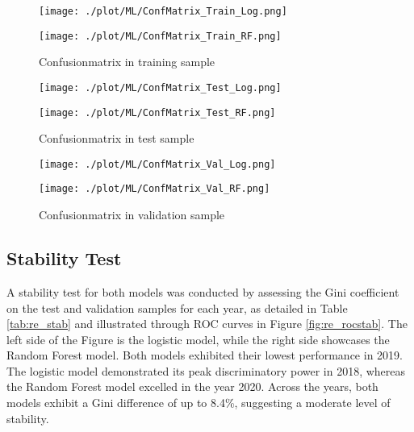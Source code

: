 \begin{figure}[H]
\begin{minipage}{.5\textwidth}
	\centering
	\texttt{[image: ./plot/ML/ConfMatrix\_Train\_Log.png]}
\end{minipage}%
\begin{minipage}{.5\textwidth}
	\centering
	\texttt{[image: ./plot/ML/ConfMatrix\_Train\_RF.png]}
\end{minipage}
    \caption{Confusionmatrix in training sample}
    \label{fig:re_confmatr1}
\end{figure}
\begin{figure}[H]
\begin{minipage}{.5\textwidth}
	\centering
	\texttt{[image: ./plot/ML/ConfMatrix\_Test\_Log.png]}
\end{minipage}%
\begin{minipage}{.5\textwidth}
	\centering
	\texttt{[image: ./plot/ML/ConfMatrix\_Test\_RF.png]}
\end{minipage}
    \caption{Confusionmatrix in test sample}
\end{figure}
\begin{figure}[H]
\begin{minipage}{.5\textwidth}
	\centering
	\texttt{[image: ./plot/ML/ConfMatrix\_Val\_Log.png]}
\end{minipage}%
\begin{minipage}{.5\textwidth}
	\centering
	\texttt{[image: ./plot/ML/ConfMatrix\_Val\_RF.png]}
\end{minipage}
    \caption{Confusionmatrix in validation sample}
    \label{fig:re_confmatr3}
\end{figure}

\subsection{Stability Test}
A stability test for both models was conducted by assessing the Gini coefficient on the test and validation samples for each year, as detailed in Table \ref{tab:re_stab} and illustrated through ROC curves in Figure \ref{fig:re_rocstab}. The left side of the Figure is the logistic model, while the right side showcases the Random Forest model. Both models exhibited their lowest performance in 2019. The logistic model demonstrated its peak discriminatory power in 2018, whereas the Random Forest model excelled in the year 2020. Across the years, both models exhibit a Gini difference of up to 8.4\%, suggesting a moderate level of stability.

